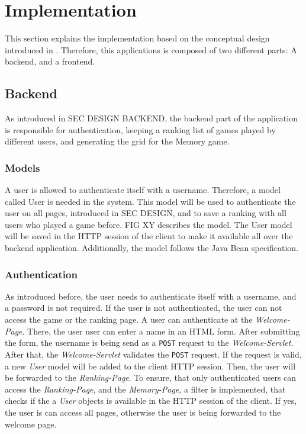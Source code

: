 \section{Implementation}\label{sec:03_impl}
This section explains the implementation based on the conceptual design introduced in .
Therefore, this applications is composed of two different parts: A backend, and a frontend.


\subsection{Backend}\label{subsec:03_impl_backend}
%
As introduced in SEC DESIGN BACKEND, the backend part of the application is responsible for authentication, keeping a ranking list of games played by different users, and generating the grid for the Memory game.

\subsubsection{Models}\label{subsubsec:03_impl_backend_models}
A user is allowed to authenticate itself with a username. Therefore, a model called User is needed in the system.
This model will be used to authenticate the user on all pages, introduced in SEC DESIGN, and to save a ranking with all users who played a game before.
FIG XY describes the model. The User model will be saved in the HTTP session of the client to make it available all over the backend application. Additionally, the model follows the Java Bean specification.

\subsubsection{Authentication}\label{subsubsec:03_impl_backend_auth}
As introduced before, the user needs to authenticate itself with a username, and a password is not required. If the user is not authenticated, the user can not access the game or the ranking page.
A user can authenticate at the \textit{Welcome-Page}. There, the user user can enter a name in an HTML form. After submitting the form, the username is being send as a \texttt{POST} request to the \textit{Welcome-Servlet}. After that, the \textit{Welcome-Servlet} validates the \texttt{POST} request. If the request is valid, a new \textit{User} model will be added to the client HTTP session. Then, the user will be forwarded to the \textit{Ranking-Page}.
To ensure, that only authenticated users can access the \textit{Ranking-Page}, and the \textit{Memory-Page}, a filter is implemented, that checks if the a \textit{User} objects is available in the HTTP session of the client. If yes, the user is can access all pages, otherwise the user is being forwarded to the welcome page.

